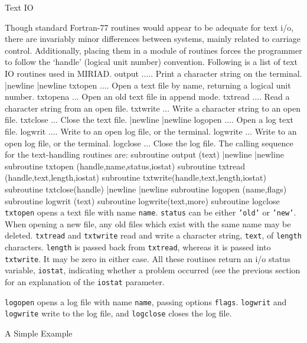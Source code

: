 \beginsection Text I\/O

Though standard Fortran-77 routines would appear to be adequate for text i/o,
there are invariably minor differences between systems, mainly related to
carriage control. Additionally, placing them in a module of routines forces
the programmer to follow the `handle' (logical unit number) convention.
Following is a list of text IO routines used in MIRIAD.
{\ninepoint\begintt
output ..... Print a character string on the terminal. |newline
   |newline 
txtopen .... Open a text file by name, returning a logical unit number.
txtopena ... Open an old text file in append mode.
txtread .... Read a character string from an open file.
txtwrite ... Write a character string to an open file.
txtclose ... Close the text file. |newline
   |newline 
logopen .... Open a log text file.
logwrit .... Write to an open log file, or the terminal.
logwrite ... Write to an open log file, or the terminal.
logclose ... Close the log file.
\endtt}
The calling sequence for the text-handling routines are:
{\ninepoint\begintt
subroutine output  (text) |newline
   |newline 
subroutine txtopen (handle,name,status,iostat)
subroutine txtread (handle,text,length,iostat)
subroutine txtwrite(handle,text,length,iostat)
subroutine txtclose(handle) |newline
   |newline 
subroutine logopen (name,flags)
subroutine logwrit (text)
subroutine logwrite(text,more)
subroutine logclose
\endtt}
{\tt txtopen} opens a text file with name {\tt name}.  {\tt status} can be
either {\tt 'old'} or {\tt 'new'}. When opening a new file, any old files
which exist with the same name may be deleted.  {\tt txtread} and
{\tt txtwrite} read and write a character string, {\tt text}, of
{\tt length} characters. {\tt length} is passed back from {\tt txtread},
whereas it is passed into {\tt txtwrite}. It may be zero in either case.
All these routines return an i/o status variable, {\tt iostat}, indicating
whether a problem occurred (see the previous section for an explanation of
the {\tt iostat} parameter.

{\tt logopen} opens a log file with name {\tt name}, passing options
{\tt flags}.  {\tt logwrit} and {\tt logwrite} write to the log file, and
{\tt logclose} closes the log file.

\beginsection A Simple Example

